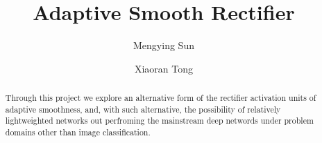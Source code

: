 \documentclass[acmtog, authorversion]{acmart}
\begin{document}
\title{Adaptive Smooth Rectifier}
\author{Mengying Sun}
\author{Xiaoran Tong}

\renewcommand\shortauthors{Zhou, G. et al}

\begin{abstract}
Through this project we explore an alternative form of the rectifier activation units of adaptive smoothness, and, with such alternative, the possibility of relatively lightweighted networks out perfroming the mainstream deep networds under problem domains other than image classification.
\end{abstract}


%
%


%
%
\end{document}
